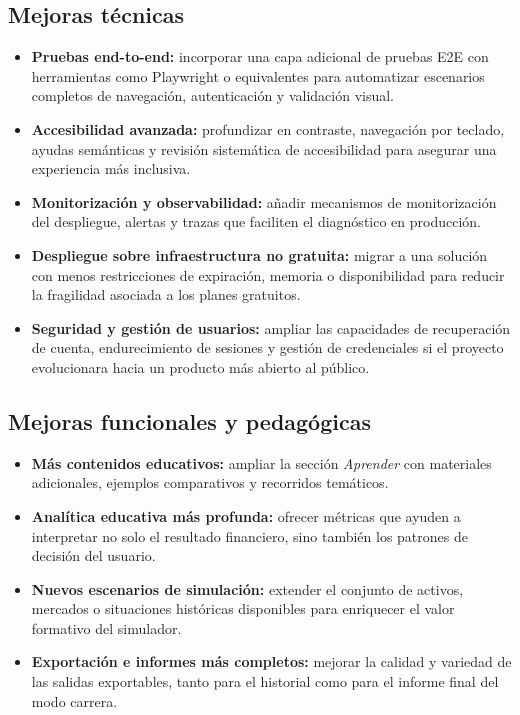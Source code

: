 \subsection{Mejoras técnicas}
\begin{itemize}
    \item \textbf{Pruebas end-to-end:} incorporar una capa adicional de pruebas E2E con herramientas como Playwright o equivalentes para automatizar escenarios completos de navegación, autenticación y validación visual.
    \item \textbf{Accesibilidad avanzada:} profundizar en contraste, navegación por teclado, ayudas semánticas y revisión sistemática de accesibilidad para asegurar una experiencia más inclusiva.
    \item \textbf{Monitorización y observabilidad:} añadir mecanismos de monitorización del despliegue, alertas y trazas que faciliten el diagnóstico en producción.
    \item \textbf{Despliegue sobre infraestructura no gratuita:} migrar a una solución con menos restricciones de expiración, memoria o disponibilidad para reducir la fragilidad asociada a los planes gratuitos.
    \item \textbf{Seguridad y gestión de usuarios:} ampliar las capacidades de recuperación de cuenta, endurecimiento de sesiones y gestión de credenciales si el proyecto evolucionara hacia un producto más abierto al público.
\end{itemize}

\subsection{Mejoras funcionales y pedagógicas}
\begin{itemize}
    \item \textbf{Más contenidos educativos:} ampliar la sección \textit{Aprender} con materiales adicionales, ejemplos comparativos y recorridos temáticos.
    \item \textbf{Analítica educativa más profunda:} ofrecer métricas que ayuden a interpretar no solo el resultado financiero, sino también los patrones de decisión del usuario.
    \item \textbf{Nuevos escenarios de simulación:} extender el conjunto de activos, mercados o situaciones históricas disponibles para enriquecer el valor formativo del simulador.
    \item \textbf{Exportación e informes más completos:} mejorar la calidad y variedad de las salidas exportables, tanto para el historial como para el informe final del modo carrera.
\end{itemize}

